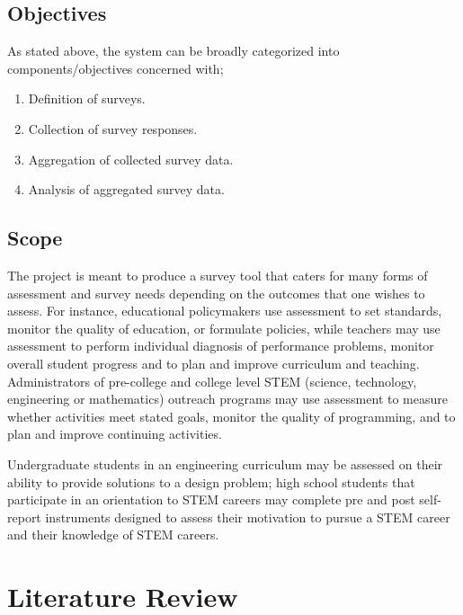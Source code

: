 \documentclass[a4paper,12pt]{article}
\begin{document}
\subsection{Objectives}

As stated above, the system can be broadly categorized into components/objectives concerned with;

\begin{enumerate}[label=(\roman*)]
\item Definition of surveys.
\item Collection of survey responses.
\item Aggregation of collected survey data.
\item Analysis of aggregated survey data.
\end{enumerate}

\subsection{Scope}


The project is meant to produce a survey tool that caters for many forms of assessment and survey needs depending on the outcomes that one wishes to assess. 
For instance, educational policymakers use assessment to set standards, monitor the quality of education, or formulate policies, while teachers may use assessment to perform individual diagnosis of performance problems, monitor overall student progress and to plan and improve curriculum and teaching. Administrators of pre-college and college level STEM (science, technology, engineering or mathematics) outreach programs may use assessment to measure whether activities meet stated goals, monitor the quality of programming, and to plan and improve continuing activities.
\par
Undergraduate students in an engineering curriculum may be assessed on their ability to provide
solutions to a design problem; high school students that participate in an orientation to STEM
careers may complete pre and post self- report instruments designed to assess their motivation to
pursue a STEM career and their knowledge of STEM careers.



\newpage
\section{Literature Review}
\end{document}
